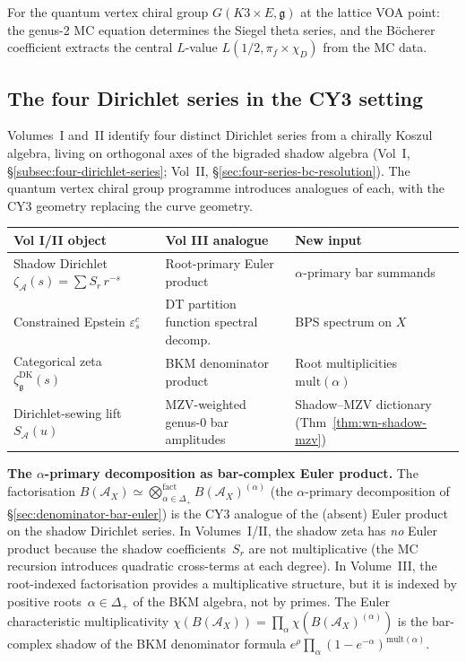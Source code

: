 \documentclass[11pt]{article}
\newcommand{\cA}{\mathcal{A}}
\newcommand{\fg}{\mathfrak{g}}
\begin{document}
\begin{conjecture}[Genus-2 BPS = B\"ocherer]
\label{conj:genus2-bps-bocherer}
For the quantum vertex chiral group $G(K3 \times E, \fg)$
at the lattice VOA point:
the genus-2 MC equation determines the Siegel theta series,
and the B\"ocherer coefficient extracts the central $L$-value
$L(1/2, \pi_f \times \chi_D)$ from the MC data.
\end{conjecture}

\subsection{The four Dirichlet series in the CY3 setting}
\label{sec:four-dirichlet-cy3}

Volumes~I and~II identify four distinct Dirichlet series
from a chirally Koszul algebra, living on orthogonal axes
of the bigraded shadow algebra
(Vol~I, \S\ref*{subsec:four-dirichlet-series};
Vol~II, \S\ref*{sec:four-series-bc-resolution}).
The quantum vertex chiral group programme introduces
analogues of each, with the CY3 geometry replacing the
curve geometry.

\begin{center}
\small
\renewcommand{\arraystretch}{1.3}
\begin{tabular}{@{}lll@{}}
\textbf{Vol I/II object} & \textbf{Vol III analogue}
 & \textbf{New input} \\
\hline
Shadow Dirichlet $\zeta_\cA(s) = \sum S_r\,r^{-s}$
 & Root-primary Euler product
 & $\alpha$-primary bar summands \\[3pt]
Constrained Epstein $\varepsilon^c_s$
 & DT partition function spectral decomp.
 & BPS spectrum on $X$ \\[3pt]
Categorical zeta $\zeta^{\mathrm{DK}}_\fg(s)$
 & BKM denominator product
 & Root multiplicities $\mathrm{mult}(\alpha)$ \\[3pt]
Dirichlet-sewing lift $S_\cA(u)$
 & MZV-weighted genus-0 bar amplitudes
 & Shadow--MZV dictionary (Thm~\ref{thm:wn-shadow-mzv})
\end{tabular}
\end{center}

\textbf{The $\alpha$-primary decomposition as bar-complex Euler product.}
The factorisation $B(\cA_X) \simeq \bigotimes_{\alpha \in
\Delta_+}^{\mathrm{fact}} B(\cA_X)^{(\alpha)}$
(the $\alpha$-primary decomposition of
\S\ref*{sec:denominator-bar-euler}) is the CY3 analogue of the
(absent) Euler product on the shadow Dirichlet series.
In Volumes~I/II, the shadow zeta has \emph{no} Euler product
because the shadow coefficients~$S_r$ are not multiplicative
(the MC recursion introduces quadratic cross-terms at each degree).
In Volume~III, the root-indexed factorisation provides a
multiplicative structure, but it is indexed by
positive roots~$\alpha \in \Delta_+$ of the BKM algebra, not by
primes. The Euler characteristic multiplicativity
$\chi(B(\cA_X)) = \prod_\alpha \chi(B(\cA_X)^{(\alpha)})$
is the bar-complex shadow of the BKM denominator formula
$e^\rho \prod_\alpha (1 - e^{-\alpha})^{\mathrm{mult}(\alpha)}$.
\end{document}
